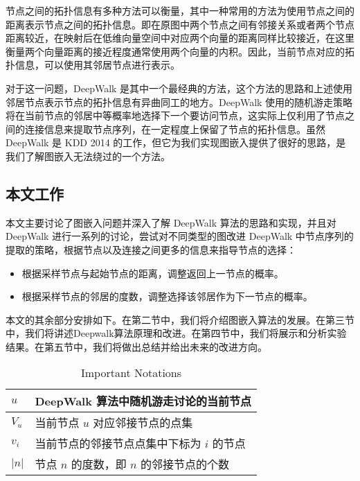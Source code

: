 \documentclass{ctexart}
\begin{document}
节点之间的拓扑信息有多种方法可以衡量，其中一种常用的方法为使用节点之间的距离表示节点之间的拓扑信息。即在原图中两个节点之间有邻接关系或者两个节点距离较近，在映射后在低维向量空间中对应两个向量的距离同样比较接近，在这里衡量两个向量距离的接近程度通常使用两个向量的内积。因此，当前节点对应的拓扑信息，可以使用其邻居节点进行表示。


对于这一问题，DeepWalk 是其中一个最经典的方法，这个方法的思路和上述使用邻居节点表示节点的拓扑信息有异曲同工的地方。DeepWalk 使用的随机游走策略将在当前节点的邻居中等概率地选择下一个要访问节点，这实际上仅利用了节点之间的连接信息来提取节点序列，在一定程度上保留了节点的拓扑信息。虽然 DeepWalk 是 KDD 2014 的工作，但它为我们实现图嵌入提供了很好的思路，是我们了解图嵌入无法绕过的一个方法。

\subsection{本文工作}

本文主要讨论了图嵌入问题并深入了解 DeepWalk 算法的思路和实现，并且对 DeepWalk 进行一系列的讨论，尝试对不同类型的图改进 DeepWalk 中节点序列的提取的策略，根据节点以及连接之间更多的信息来指导节点的选择：

\begin{itemize}
    \item 根据采样节点与起始节点的距离，调整返回上一节点的概率。
    \item 根据采样节点的邻居的度数，调整选择该邻居作为下一节点的概率。
\end{itemize}

本文的其余部分安排如下。在第二节中，我们将介绍图嵌入算法的发展。在第三节中，我们将讲述Deepwalk算法原理和改进。在第四节中，我们将展示和分析实验结果。在第五节中，我们将做出总结并给出未来的改进方向。

\begin{table}[!t]
\renewcommand{\arraystretch}{1.1}
\caption{Important Notations}
\label{notations}
\centering
\begin{tabular}{|l|p{}|}
    \hline
    \(u\) & DeepWalk 算法中随机游走讨论的当前节点 \\
    \hline
    \(V_u\) & 当前节点 \(u\) 对应邻接节点的点集 \\
    \hline
    \(v_i\) & 当前节点的邻接节点点集中下标为 \(i\) 的节点 \\
    \hline
    \(|n|\) & 节点 \(n\) 的度数，即 \(n\) 的邻接节点的个数 \\
    \hline
\end{tabular}
\end{table}
\end{document}
